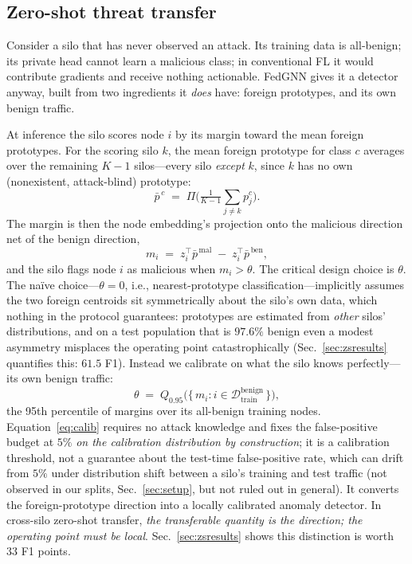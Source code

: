 \documentclass[journal]{IEEEtran}
\begin{document}
\subsection{Zero-shot threat transfer}
\label{sec:zeroshot}
Consider a silo that has never observed an attack. Its training data
is all-benign; its private head cannot learn a malicious class; in
conventional FL it would contribute gradients and receive nothing
actionable. FedGNN gives it a detector anyway, built from two
ingredients it \emph{does} have: foreign prototypes, and its own
benign traffic.

At inference the silo scores node $i$ by its margin toward the mean
foreign prototypes. For the scoring silo $k$, the mean foreign
prototype for class $c$ averages over the remaining $K-1$
silos---every silo \emph{except} $k$, since $k$ has no own
(nonexistent, attack-blind) prototype:
\begin{equation}
\bar{p}^{\,c} \;=\; \Pi\Big(\tfrac{1}{K-1}\textstyle\sum_{j \ne k} p_j^{c}\Big).
\label{eq:protomean}
\end{equation}
The margin is then the node embedding's projection onto the malicious
direction net of the benign direction,
\begin{equation}
m_i \;=\; z_i^{\top}\bar{p}^{\,\mathrm{mal}}
\;-\; z_i^{\top}\bar{p}^{\,\mathrm{ben}},
\label{eq:margin}
\end{equation}
and the silo flags node $i$ as malicious when $m_i > \theta$. The
critical design choice is $\theta$. The
na\"ive choice---$\theta{=}0$, i.e., nearest-prototype
classification---implicitly assumes the two foreign centroids sit
symmetrically about the silo's own data, which nothing in the protocol
guarantees: prototypes are estimated from \emph{other} silos'
distributions, and on a test population that is $97.6\%$ benign even a
modest asymmetry misplaces the operating point catastrophically
(Sec.~\ref{sec:zsresults} quantifies this: $61.5$ F1). Instead we
calibrate on what the silo knows perfectly---its own benign traffic:
\begin{equation}
\theta \;=\; Q_{0.95}\big(\{\, m_i : i \in
\mathcal{D}_{\mathrm{train}}^{\mathrm{benign}} \,\}\big),
\label{eq:calib}
\end{equation}
the 95th percentile of margins over its all-benign training nodes.
Equation~\eqref{eq:calib} requires no attack knowledge and fixes the
false-positive budget at $5\%$ \emph{on the calibration distribution
by construction}; it is a calibration threshold, not a guarantee about
the test-time false-positive rate, which can drift from $5\%$ under
distribution shift between a silo's training and test traffic (not
observed in our splits, Sec.~\ref{sec:setup}, but not ruled out in
general). It converts the foreign-prototype direction into a locally
calibrated anomaly
detector. In cross-silo zero-shot transfer, \emph{the transferable
quantity is the direction; the operating point must be local}.
Sec.~\ref{sec:zsresults} shows this
distinction is worth $33$ F1 points.
\end{document}
